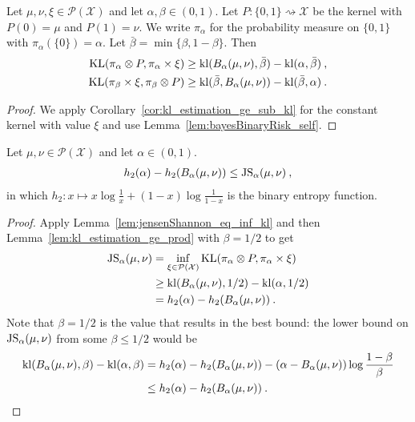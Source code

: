 \begin{lemma}
  \label{lem:kl_estimation_ge_prod}
  Let $\mu, \nu, \xi \in \mathcal P(\mathcal X)$ and let $\alpha, \beta \in (0, 1)$. Let $P : \{0,1\} \rightsquigarrow \mathcal X$ be the kernel with $P(0) = \mu$ and $P(1) = \nu$. We write $\pi_\alpha$ for the probability measure on $\{0,1\}$ with $\pi_\alpha(\{0\}) = \alpha$. Let $\bar{\beta} = \min\{\beta, 1 - \beta\}$.
  Then
  \begin{align*}
  \operatorname{KL}(\pi_\alpha \otimes P, \pi_\alpha \times \xi)
  &\ge \operatorname{kl}(B_\alpha(\mu, \nu), \bar{\beta}) - \operatorname{kl}(\alpha, \bar{\beta})
  \: , \\
  \operatorname{KL}(\pi_\beta \times \xi, \pi_\beta \otimes P)
  &\ge \operatorname{kl}(\bar{\beta}, B_\alpha(\mu, \nu)) - \operatorname{kl}(\bar{\beta}, \alpha)
  \: .
  \end{align*}
\end{lemma}

\begin{proof}%
{}
We apply Corollary~\ref{cor:kl_estimation_ge_sub_kl} for the constant kernel with value $\xi$ and use Lemma~\ref{lem:bayesBinaryRisk_self}.
\end{proof}


\begin{theorem}
  \label{thm:sub_bayesBinaryRisk_le_jensenShannon}
  Let $\mu, \nu \in \mathcal P(\mathcal X)$ and let $\alpha \in (0, 1)$.
  \begin{align*}
  h_2(\alpha) - h_2(B_\alpha(\mu, \nu)) \le \operatorname{JS}_\alpha(\mu, \nu) \: ,
  \end{align*}
  in which $h_2: x \mapsto x\log\frac{1}{x} + (1 - x)\log\frac{1}{1 - x}$ is the binary entropy function.
\end{theorem}

\begin{proof}%
{}
Apply Lemma~\ref{lem:jensenShannon_eq_inf_kl} and then Lemma~\ref{lem:kl_estimation_ge_prod} with $\beta = 1/2$ to get
\begin{align*}
\operatorname{JS}_\alpha(\mu, \nu)
&= \inf_{\xi \in \mathcal P(\mathcal X)}\operatorname{KL}(\pi_\alpha \otimes P, \pi_\alpha \times \xi)
\\
&\ge \operatorname{kl}(B_\alpha(\mu, \nu), 1/2) - \operatorname{kl}(\alpha, 1/2)
\\
&= h_2(\alpha) - h_2(B_\alpha(\mu, \nu)) \: .
\end{align*}
Note that $\beta = 1/2$ is the value that results in the best bound: the lower bound on $\operatorname{JS}_\alpha(\mu, \nu)$ from some $\beta \le 1/2$ would be
\begin{align*}
\operatorname{kl}(B_\alpha(\mu, \nu), \beta) - \operatorname{kl}(\alpha, \beta)
&= h_2(\alpha) - h_2(B_\alpha(\mu, \nu)) - (\alpha - B_\alpha(\mu, \nu)) \log \frac{1 - \beta}{\beta}
\\
&\le h_2(\alpha) - h_2(B_\alpha(\mu, \nu)) \: .
\end{align*}

\end{proof}


